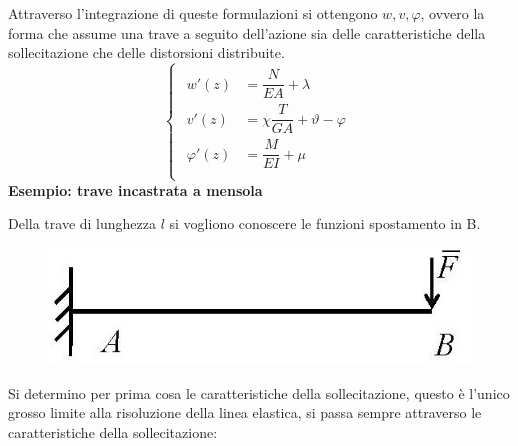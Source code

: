 \documentclass{article}
\begin{document}
\begin{adjustwidth}{2in}{}
		Attraverso l'integrazione di queste formulazioni si ottengono $w, v, \varphi$, ovvero la forma che assume una trave a seguito dell'azione sia delle caratteristiche della sollecitazione che delle distorsioni distribuite.  
		\[
		\begin{cases}
			\begin{aligned}
				w'(z) & =   \dfrac{N}{EA} + \lambda \\
				v'(z) & = \chi\dfrac{T}{GA} +\vartheta- \varphi \\
				\varphi'(z) & =  \dfrac{M}{EI} + \mu \\
			\end{aligned}	
		\end{cases}
		\]
\newpage		
		\textbf{Esempio: trave incastrata a mensola} 
		
		Della trave di lunghezza $ l $ si vogliono conoscere le funzioni spostamento in B.
		
\begin{figure}[H]
	\centering
	\includegraphics[width=0.3\linewidth]{"immagini/1.PARTE8_Pagina_13 (2)"}
\end{figure}
		
		Si determino per prima cosa le caratteristiche della sollecitazione, questo è l'unico grosso limite alla risoluzione della linea elastica, si passa sempre attraverso le caratteristiche della sollecitazione:
		

\end{adjustwidth}
\end{document}
